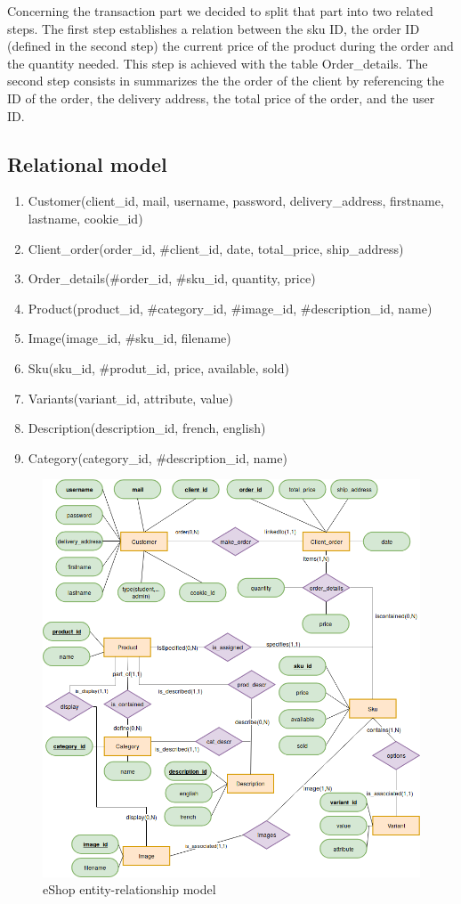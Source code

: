 \documentclass{article}
\begin{document}
Concerning the transaction part we decided to split that part into two related steps. The first step establishes a relation between the sku ID, the order ID (defined in the second step) the  current price of the product during the order and the quantity needed. This step is achieved with the table Order\_details. The second step consists in summarizes the the order of the client by referencing the ID of the order, the delivery address, the total price of the order, and  the user ID.

\subsection{Relational model}
\begin{enumerate}
\item Customer(client\_id, mail, username, password, delivery\_address, firstname, lastname, cookie\_id)
\item Client\_order(order\_id, \#client\_id, date, total\_price, ship\_address)
\item Order\_details(\#order\_id, \#sku\_id, quantity, price)
\item Product(product\_id, \#category\_id, \#image\_id, \#description\_id, name)
\item Image(image\_id, \#sku\_id, filename)
\item Sku(sku\_id, \#produt\_id, price, available, sold)
\item Variants(variant\_id, attribute, value)
\item Description(description\_id, french, english)
\item Category(category\_id, \#description\_id, name)
\end{enumerate}

\begin{figure}[h!]
    \centering
    \includegraphics[scale=0.4]{./images/ecommerce_ER.png}
    \caption{eShop entity-relationship model}
    \label{ecommerce_er}
\end{figure}
\end{document}
